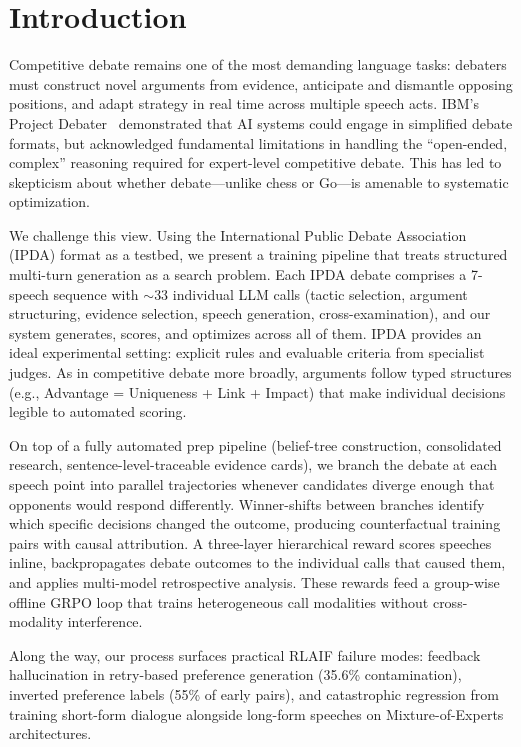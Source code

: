\section{Introduction}
\label{sec:intro}

Competitive debate remains one of the most demanding language tasks: debaters
must construct novel arguments from evidence, anticipate and dismantle opposing
positions, and adapt strategy in real time across multiple speech acts. IBM's
Project Debater~\cite{slonim2021debater} demonstrated that AI systems could
engage in simplified debate formats, but acknowledged fundamental limitations
in handling the ``open-ended, complex'' reasoning required for expert-level
competitive debate. This has led to skepticism about whether debate---unlike
chess or Go---is amenable to systematic optimization.

We challenge this view. Using the International Public Debate Association (IPDA)
format as a testbed, we present a training pipeline that treats structured
multi-turn generation as a search problem. Each IPDA debate comprises a
7-speech sequence with ${\sim}33$ individual LLM calls (tactic selection,
argument structuring, evidence selection, speech generation, cross-examination),
and our system generates, scores, and optimizes across all of them. IPDA
provides an ideal experimental setting: explicit rules and evaluable criteria
from specialist judges. As in competitive debate more broadly, arguments
follow typed structures (e.g., Advantage = Uniqueness + Link + Impact) that
make individual decisions legible to automated scoring.

On top of a fully automated prep pipeline (belief-tree construction,
consolidated research, sentence-level-traceable evidence cards), we branch
the debate at each speech point into parallel trajectories whenever
candidates diverge enough that opponents would respond differently.
Winner-shifts between branches identify which specific decisions changed
the outcome, producing counterfactual training pairs with causal
attribution. A three-layer hierarchical reward scores speeches inline,
backpropagates debate outcomes to the individual calls that caused them,
and applies multi-model retrospective analysis. These rewards feed a
group-wise offline GRPO loop that trains heterogeneous call modalities
without cross-modality interference.

Along the way, our process surfaces practical RLAIF failure modes:
feedback hallucination in retry-based preference generation
(35.6\% contamination), inverted preference labels (55\% of early pairs),
and catastrophic regression from training short-form dialogue alongside
long-form speeches on Mixture-of-Experts architectures.

